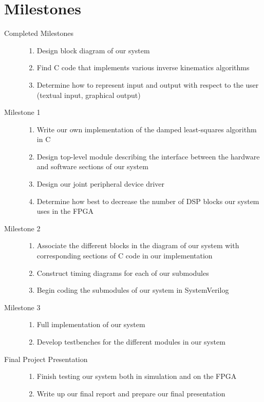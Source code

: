 \section{Milestones}

\begin{description}
\item[Completed Milestones] \hfill
\begin{enumerate}
\item Design block diagram of our system
\item Find C code that implements various inverse kinematics algorithms
\item Determine how to represent input and output with respect to the user (textual input, graphical output)
\end{enumerate}

\item[Milestone 1] \hfill
\begin{enumerate}
\item Write our own implementation of the damped least-squares algorithm in C
\item Design top-level module describing the interface between the hardware and software sections of our system
\item Design our joint peripheral device driver
\item Determine how best to decrease the number of DSP blocks our system uses in the FPGA
\end{enumerate}


\item[Milestone 2] \hfill 
\begin{enumerate}
\item Associate the different blocks in the diagram of our system with corresponding sections of C code in our implementation
\item Construct timing diagrams for each of our submodules
\item Begin coding the submodules of our system in SystemVerilog
\end{enumerate}

\item[Milestone 3] \hfill 
\begin{enumerate}
\item Full implementation of our system
\item Develop testbenches for the different modules in our system
\end{enumerate}

\item[Final Project Presentation] \hfill
\begin{enumerate}
\item Finish testing our system both in simulation and on the FPGA
\item Write up our final report and prepare our final presentation
\end{enumerate}

\end{description}

%
%
%
%
%

